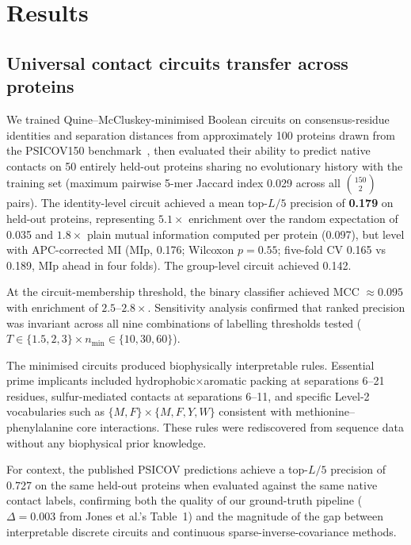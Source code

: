 \section{Results}
\label{sec:results}

\subsection{Universal contact circuits transfer across proteins}
\label{sec:res-transfer}

We trained Quine--McCluskey-minimised Boolean circuits on consensus-residue
identities and separation distances from approximately 100 proteins drawn
from the PSICOV150 benchmark~\cite{jones2012}, then evaluated their ability
to predict native contacts on 50 entirely held-out proteins sharing no
evolutionary history with the training set (maximum pairwise 5-mer Jaccard
index 0.029 across all $\binom{150}{2}$ pairs).  The identity-level circuit
achieved a mean top-$L/5$ precision of \textbf{0.179} on held-out proteins,
representing $5.1\times$ enrichment over the random expectation of 0.035 and
$1.8\times$ plain mutual information computed per protein (0.097), but
level with APC-corrected MI (MIp, 0.176; Wilcoxon $p = 0.55$; five-fold CV 0.165 vs 0.189, MIp ahead in four folds).  The group-level circuit achieved 0.142.

At the circuit-membership threshold, the binary classifier achieved MCC
$\approx 0.095$ with enrichment of $2.5$--$2.8\times$.  Sensitivity analysis
confirmed that ranked precision was invariant across all nine combinations of
labelling thresholds tested ($T \in \{1.5, 2, 3\} \times n_{\min} \in \{10,
	30, 60\}$).

The minimised circuits produced biophysically interpretable rules.  Essential
prime implicants included hydrophobic$\times$aromatic packing at separations
6--21 residues, sulfur-mediated contacts at separations 6--11, and specific
Level-2 vocabularies such as $\{M,F\}\times\{M,F,Y,W\}$ consistent with
methionine--phenylalanine core interactions.  These rules were rediscovered
from sequence data without any biophysical prior knowledge.

For context, the published PSICOV predictions achieve a top-$L/5$ precision
of 0.727 on the same held-out proteins when evaluated against the same native
contact labels, confirming both the quality of our ground-truth pipeline
($\Delta = 0.003$ from Jones et al.'s Table~1) and the magnitude of the gap
between interpretable discrete circuits and continuous sparse-inverse-covariance
methods.


